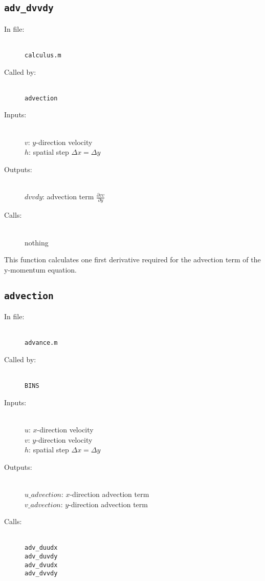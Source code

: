 \documentclass[12pt]{article}
\begin{document}
\subsection{\texttt{adv\_dvvdy}}
\begin{description}
\item[In file:] \hfill \\ \texttt{calculus.m}
\item[Called by:] \hfill \\ \texttt{advection}
\item[Inputs:] \hfill \\ $v$: $y$-direction velocity \\ $h$: spatial step $\Delta x = \Delta y$
\item[Outputs:] \hfill \\ $dvvdy$: advection term $\frac{\partial vv}{\partial y}$
\item[Calls:] \hfill \\ nothing
\end{description}
This function calculates one first derivative required for the advection term of the y-momentum equation.

\subsection{\texttt{advection}}
\begin{description}
\item[In file:] \hfill \\ \texttt{advance.m}
\item[Called by:] \hfill \\ \texttt{BINS}
\item[Inputs:] \hfill \\ $u$: $x$-direction velocity \\ $v$: $y$-direction velocity \\ $h$: spatial step $\Delta x = \Delta y$ 
\item[Outputs:] \hfill \\ $u\_advection$: $x$-direction advection term \\ $v\_advection$: $y$-direction advection term 
\item[Calls:] \hfill \\ \texttt{adv\_duudx} \\ \texttt{adv\_duvdy} \\ \texttt{adv\_dvudx} \\ \texttt{adv\_dvvdy}
\end{description}
\end{document}
